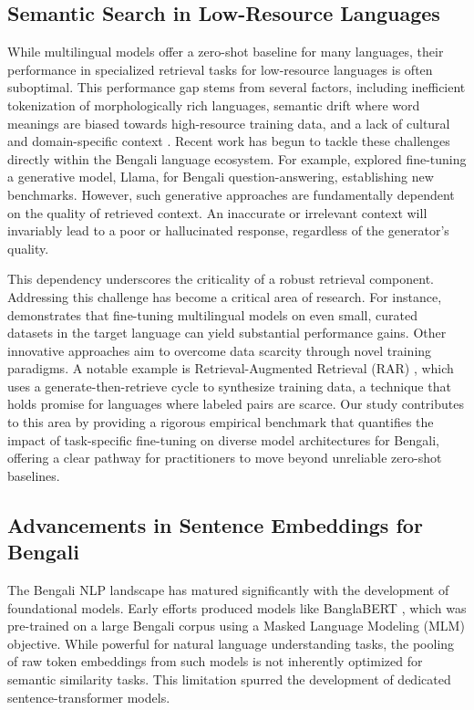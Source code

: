 \documentclass[manuscript,screen,review]{acmart}
\begin{document}
\subsection{Semantic Search in Low-Resource Languages}
While multilingual models offer a zero-shot baseline for many languages, their performance in specialized retrieval tasks for low-resource languages is often suboptimal. This performance gap stems from several factors, including inefficient tokenization of morphologically rich languages, semantic drift where word meanings are biased towards high-resource training data, and a lack of cultural and domain-specific context \cite{lin2024improving}. Recent work has begun to tackle these challenges directly within the Bengali language ecosystem. For example, \cite{debanath2025advancing} explored fine-tuning a generative model, Llama, for Bengali question-answering, establishing new benchmarks. However, such generative approaches are fundamentally dependent on the quality of retrieved context. An inaccurate or irrelevant context will invariably lead to a poor or hallucinated response, regardless of the generator's quality.

This dependency underscores the criticality of a robust retrieval component. Addressing this challenge has become a critical area of research. For instance, \cite{lin2024improving} demonstrates that fine-tuning multilingual models on even small, curated datasets in the target language can yield substantial performance gains. Other innovative approaches aim to overcome data scarcity through novel training paradigms. A notable example is Retrieval-Augmented Retrieval (RAR) \cite{yasunaga2022retrieval}, which uses a generate-then-retrieve cycle to synthesize training data, a technique that holds promise for languages where labeled pairs are scarce. Our study contributes to this area by providing a rigorous empirical benchmark that quantifies the impact of task-specific fine-tuning on diverse model architectures for Bengali, offering a clear pathway for practitioners to move beyond unreliable zero-shot baselines.

\subsection{Advancements in Sentence Embeddings for Bengali}
The Bengali NLP landscape has matured significantly with the development of foundational models. Early efforts produced models like BanglaBERT \cite{bhattacharjee2020banglabert}, which was pre-trained on a large Bengali corpus using a Masked Language Modeling (MLM) objective. While powerful for natural language understanding tasks, the pooling of raw token embeddings from such models is not inherently optimized for semantic similarity tasks. This limitation spurred the development of dedicated sentence-transformer models.
\end{document}
